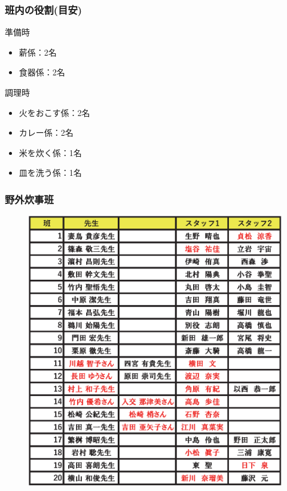 \newpage

\subsubsection{班内の役割(目安)}

準備時
\begin{itemize}
  \item 薪係：2名
  \item 食器係：2名
\end{itemize}

調理時
\begin{itemize}
  \item 火をおこす係：2名
  \item カレー係：2名
  \item 米を炊く係：1名
  \item 皿を洗う係：1名
\end{itemize}

\subsubsection{野外炊事班}
\begin{figure}[H]
\begin{center}
\includegraphics[scale=0.9]{./09/yagaisuijihanwake.eps}
\end{center}
\end{figure}


